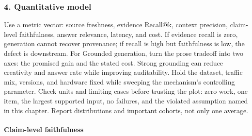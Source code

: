 \subsubsection*{4. Quantitative model}
Use a metric vector: source freshness, evidence Recall@k, context precision, claim-level faithfulness, answer relevance, latency, and cost. If evidence recall is zero, generation cannot recover provenance; if recall is high but faithfulness is low, the defect is downstream.
For Grounded generation, turn the prose tradeoff into two axes: the promised gain and the stated cost. Strong grounding can reduce creativity and answer rate while improving auditability. Hold the dataset, traffic mix, versions, and hardware fixed while sweeping the mechanism's controlling parameter.
Check units and limiting cases before trusting the plot: zero work, one item, the largest supported input, no failures, and the violated assumption named in this chapter. Report distributions and important cohorts, not only one average.
\paragraph{Claim-level faithfulness}
